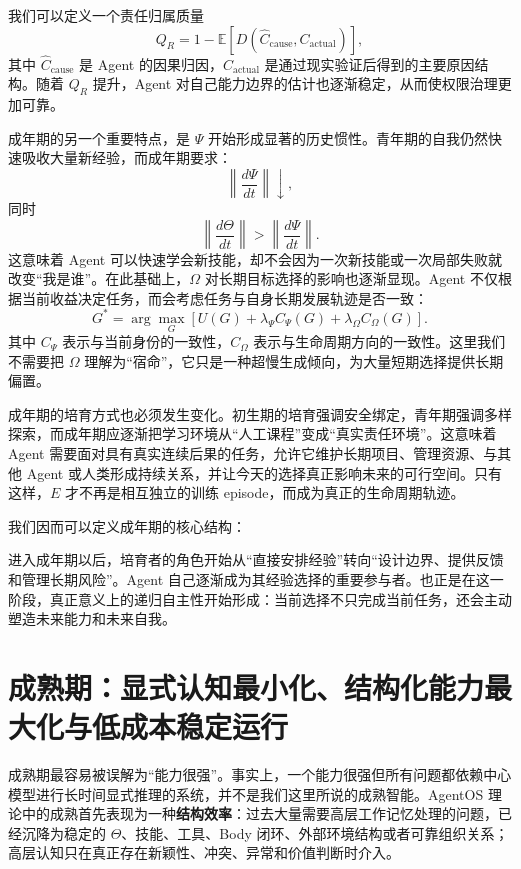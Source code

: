 我们可以定义一个责任归属质量
\[
Q_R
=
1-
\mathbb E
\left[
D(
\hat C_{\mathrm{cause}},
C_{\mathrm{actual}}
)
\right],
\]
其中 $\hat C_{\mathrm{cause}}$ 是 Agent 的因果归因，$C_{\mathrm{actual}}$ 是通过现实验证后得到的主要原因结构。随着 $Q_R$ 提升，Agent 对自己能力边界的估计也逐渐稳定，从而使权限治理更加可靠。

成年期的另一个重要特点，是 $\Psi$ 开始形成显著的历史惯性。青年期的自我仍然快速吸收大量新经验，而成年期要求：
\[
\left\|
\frac{d\Psi}{dt}
\right\|
\downarrow,
\]
同时
\[
\left\|
\frac{d\Theta}{dt}
\right\|
>
\left\|
\frac{d\Psi}{dt}
\right\|.
\]
这意味着 Agent 可以快速学会新技能，却不会因为一次新技能或一次局部失败就改变“我是谁”。在此基础上，$\Omega$ 对长期目标选择的影响也逐渐显现。Agent 不仅根据当前收益决定任务，而会考虑任务与自身长期发展轨迹是否一致：
\[
G^*
=
\arg\max_G
\left[
U(G)
+
\lambda_\Psi C_\Psi(G)
+
\lambda_\Omega C_\Omega(G)
\right].
\]
其中 $C_\Psi$ 表示与当前身份的一致性，$C_\Omega$ 表示与生命周期方向的一致性。这里我们不需要把 $\Omega$ 理解为“宿命”，它只是一种超慢生成倾向，为大量短期选择提供长期偏置。

成年期的培育方式也必须发生变化。初生期的培育强调安全绑定，青年期强调多样探索，而成年期应逐渐把学习环境从“人工课程”变成“真实责任环境”。这意味着 Agent 需要面对具有真实连续后果的任务，允许它维护长期项目、管理资源、与其他 Agent 或人类形成持续关系，并让今天的选择真正影响未来的可行空间。只有这样，$E$ 才不再是相互独立的训练 episode，而成为真正的生命周期轨迹。

我们因而可以定义成年期的核心结构：
\begin{statementbox}
\centering
{}
\end{statementbox}
进入成年期以后，培育者的角色开始从“直接安排经验”转向“设计边界、提供反馈和管理长期风险”。Agent 自己逐渐成为其经验选择的重要参与者。也正是在这一阶段，真正意义上的递归自主性开始形成：当前选择不只完成当前任务，还会主动塑造未来能力和未来自我。

\section{成熟期：显式认知最小化、结构化能力最大化与低成本稳定运行}

成熟期最容易被误解为“能力很强”。事实上，一个能力很强但所有问题都依赖中心模型进行长时间显式推理的系统，并不是我们这里所说的成熟智能。AgentOS 理论中的成熟首先表现为一种\textbf{结构效率}：过去大量需要高层工作记忆处理的问题，已经沉降为稳定的 $\Theta$、技能、工具、Body 闭环、外部环境结构或者可靠组织关系；高层认知只在真正存在新颖性、冲突、异常和价值判断时介入。

